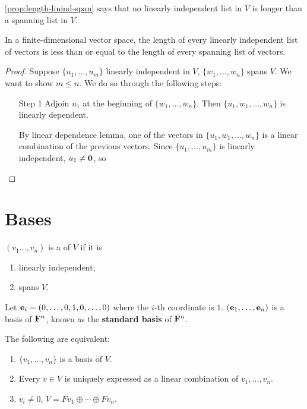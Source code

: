 \cref{prop:length-linind-span} says that no linearly independent list in $V$ is longer than a spanning list in $V$.

\begin{proposition}\label{prop:length-linind-span}
In a finite-dimensional vector space, the length of every linearly independent list of vectors is less than or equal to the length of every spanning list of vectors.
\end{proposition}

\begin{proof}
Suppose $\{u_1,\dots,u_m\}$ linearly independent in $V$, $\{w_1,\dots,w_n\}$ spans $V$. We want to show $m\le n$. We do so through the following steps:
\begin{itemize}
\item[Step 1] Adjoin $u_1$ at the beginning of $\{w_1,\dots,w_n\}$. Then $\{u_1,w_1,\dots,w_n\}$ is linearly dependent.

By linear dependence lemma, one of the vectors in $\{u_1,w_1,\dots,w_n\}$ is a linear combination of the previous vectors. Since $\{u_1,\dots,u_m\}$ is linearly independent, $u_1\neq\vb{0}$, so 
\end{itemize}
\end{proof}

\section{Bases}
\begin{definition}[Basis]
$(v_1\dots,v_n)$ is a  of $V$ if it is
\begin{enumerate}[label=(\roman*)]
\item linearly independent;
\item spans $V$.
\end{enumerate}
\end{definition}

\begin{example}
Let $\vb{e}_i=(0,\dots,0,1,0,\dots,0)$ where the $i$-th coordinate is $1$. $(\vb{e}_1,\dots,\vb{e}_n)$ is a basis of $\mathbf F^n$, known as the \textbf{standard basis} of $\mathbf F^n$.
\end{example}

\begin{lemma}\label{lemma:basis-criterion}
The following are equivalent:
\begin{enumerate}[label=(\roman*)]
\item $\{v_1,\dots,v_n\}$ is a basis of $V$.
\item Every $v\in V$ is uniquely expressed as a linear combination of $v_1,\dots,v_n$.
\item $v_i\neq0$, $V=Fv_1\oplus\cdots\oplus Fv_n$.
\end{enumerate}
\end{lemma}

